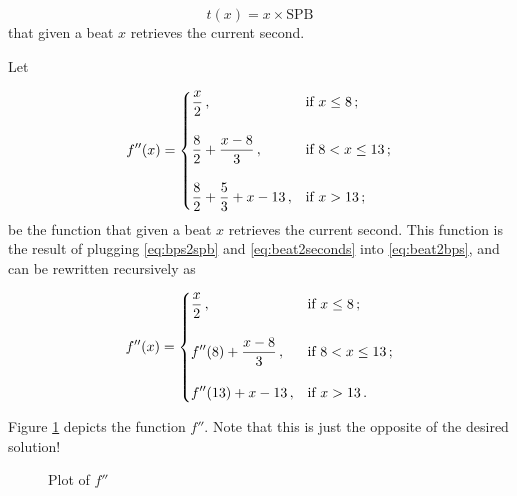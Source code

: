 \documentclass[a4paper,9pt]{article}
\begin{document}
\begin{equation}
	t(x) = x\times \text{SPB}
	\label{eq:beat2seconds}
\end{equation}
that given a beat $x$ retrieves the current second.

Let 



    \begin{equation}
	    f''(x) = \begin{dcases}
		    \frac{x}{2}\,, & \text{if $x \leq 8\,;$}\\[1em]
		    \frac{8}{2}+\frac{x-8}{3}\,, & \text{if $8 < x \leq 13\,;$}\\[1em]  
		    \frac{8}{2}+\frac{5}{3}+x- 13\,, & \text{if $x > 13\,;$}\\ 
	    \end{dcases}
	    \label{eq:beat2second}
    \end{equation}
    be the function that given a beat $x$ retrieves the current second. This function is the result of plugging \eqref{eq:bps2spb} and \eqref{eq:beat2seconds} into \eqref{eq:beat2bps}, and can be rewritten recursively as

    \begin{equation}
	    f''(x) = \begin{dcases}
		    \frac{x}{2}\,, & \text{if $x \leq 8\,;$}\\[1em]
		    f''(8)+\frac{x-8}{3}\,, & \text{if $8 < x \leq 13\,;$}\\[1em]  
		    f''(13) + x- 13\,, & \text{if $x > 13\,.$}\\ 
	    \end{dcases}
	    \label{eq:beat2second}
    \end{equation}

    Figure \ref{fig:beat2second} depicts the function $f''$. Note that this is just the opposite of the desired solution!
    
\begin{figure}[htpb]
	\centering

	\caption{Plot of $f''$}
	\label{fig:beat2second}
\end{figure}
\end{document}
